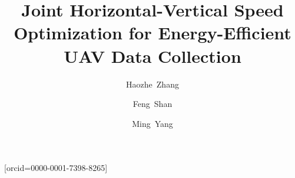 \documentclass[a4paper,fleqn]{cas-dc}
\begin{document}
\let\WriteBookmarks\relax
\def\floatpagepagefraction{1}
\def\textpagefraction{.001}

\title[mode=title]{Joint Horizontal-Vertical Speed Optimization for Energy-Efficient UAV Data Collection}

\shorttitle{}    

%
\author[2]{Haozhe~Zhang}
\author[1, 2]{Feng~Shan}[orcid=0000-0001-7398-8265] \cormark[1]
\author[1, 2]{Ming~Yang}

\address[1]{School of Computer Science and Engineering, Southeast University, Nanjing 211189, Jiangsu, P. R. China}
\address[2]{Jiangsu Key Laboratory of Network and Information Security, Southeast University, Nanjing 211189, Jiangsu, P. R. China}

\shortauthors{}  


\end{document}
